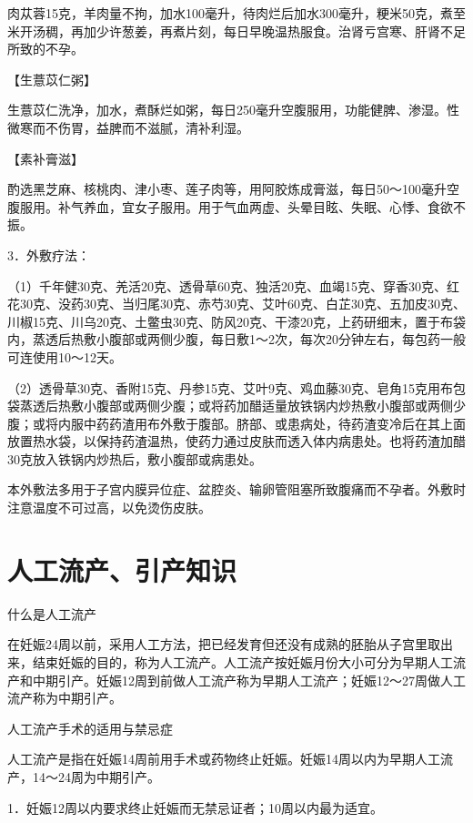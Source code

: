 \documentclass[12pt,UTF8,openany]{ctexbook}
\begin{document}
肉苁蓉15克，羊肉量不拘，加水100毫升，待肉烂后加水300毫升，粳米50克，煮至米开汤稠，再加少许葱姜，再煮片刻，每日早晚温热服食。治肾亏宫寒、肝肾不足所致的不孕。

【生薏苡仁粥】

生薏苡仁洗净，加水，煮酥烂如粥，每日250毫升空腹服用，功能健脾、渗湿。性微寒而不伤胃，益脾而不滋腻，清补利湿。

【素补膏滋】

酌选黑芝麻、核桃肉、津小枣、莲子肉等，用阿胶炼成膏滋，每日50～100毫升空腹服用。补气养血，宜女子服用。用于气血两虚、头晕目眩、失眠、心悸、食欲不振。

3．外敷疗法：

（1）千年健30克、羌活20克、透骨草60克、独活20克、血竭15克、穿香30克、红花30克、没药30克、当归尾30克、赤芍30克、艾叶60克、白芷30克、五加皮30克、川椒15克、川乌20克、土鳖虫30克、防风20克、干漆20克，上药研细末，置于布袋内，蒸透后热敷小腹部或两侧少腹，每日敷1～2次，每次20分钟左右，每包药一般可连使用10～12天。

（2）透骨草30克、香附15克、丹参15克、艾叶9克、鸡血藤30克、皂角15克用布包袋蒸透后热敷小腹部或两侧少腹；或将药加醋适量放铁锅内炒热敷小腹部或两侧少腹；或将内服中药药渣用布外敷于腹部。脐部、或患病处，待药渣变冷后在其上面放置热水袋，以保持药渣温热，使药力通过皮肤而透入体内病患处。也将药渣加醋30克放入铁锅内炒热后，敷小腹部或病患处。

本外敷法多用于子宫内膜异位症、盆腔炎、输卵管阻塞所致腹痛而不孕者。外敷时注意温度不可过高，以免烫伤皮肤。





\chapter{人工流产、引产知识}


什么是人工流产


在妊娠24周以前，采用人工方法，把已经发育但还没有成熟的胚胎从子宫里取出来，结束妊娠的目的，称为人工流产。人工流产按妊娠月份大小可分为早期人工流产和中期引产。妊娠12周到前做人工流产称为早期人工流产；妊娠12～27周做人工流产称为中期引产。





人工流产手术的适用与禁忌症


人工流产是指在妊娠14周前用手术或药物终止妊娠。妊娠14周以内为早期人工流产，14～24周为中期引产。

1．妊娠12周以内要求终止妊娠而无禁忌证者；10周以内最为适宜。
\end{document}
